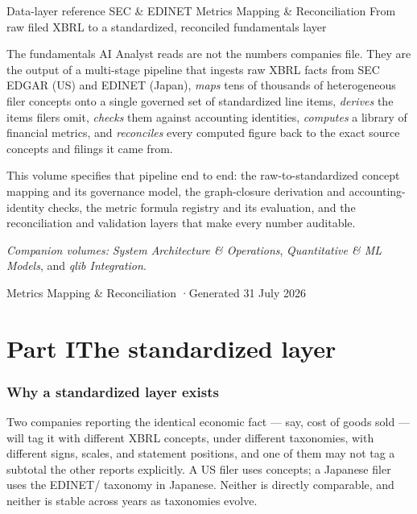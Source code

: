 \documentclass[11pt]{article}
\begin{document}
\mzqatitlepage
  {Data-layer reference}
  {SEC \& EDINET Metrics Mapping \& Reconciliation}
  {From raw filed XBRL to a standardized, reconciled fundamentals layer}
  {The fundamentals AI Analyst reads are not the numbers companies file. They are
   the output of a multi-stage pipeline that ingests raw XBRL facts from SEC EDGAR
   (US) and EDINET (Japan), \emph{maps} tens of thousands of heterogeneous filer
   concepts onto a single governed set of standardized line items, \emph{derives}
   the items filers omit, \emph{checks} them against accounting identities,
   \emph{computes} a library of financial metrics, and \emph{reconciles} every
   computed figure back to the exact source concepts and filings it came from.

   \vspace{8pt}
   This volume specifies that pipeline end to end: the raw-to-standardized concept
   mapping and its governance model, the graph-closure derivation and
   accounting-identity checks, the metric formula registry and its evaluation, and
   the reconciliation and validation layers that make every number auditable.

   \vspace{8pt}
   \textit{Companion volumes:} \emph{System Architecture \& Operations},
   \emph{Quantitative \& ML Models}, and \emph{qlib Integration}.}
  {Metrics Mapping \& Reconciliation \quad·\quad Generated 31 July 2026}

\mzqatoc
\clearpage

\part*{Part I\quad The standardized layer}

\section{Why a standardized layer exists}

Two companies reporting the identical economic fact --- say, cost of goods sold ---
will tag it with different XBRL concepts, under different taxonomies, with
different signs, scales, and statement positions, and one of them may not tag a
subtotal the other reports explicitly. A US filer uses  concepts; a
Japanese filer uses the EDINET/ taxonomy in Japanese. Neither is
directly comparable, and neither is stable across years as taxonomies evolve.
\end{document}
